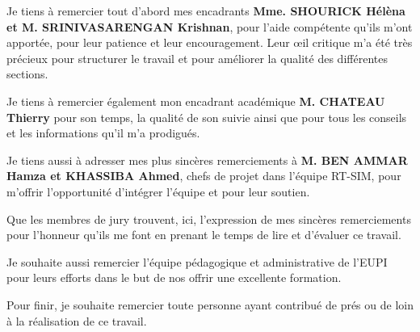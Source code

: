 
Je tiens à remercier tout d’abord mes encadrants \textbf{Mme. SHOURICK Hélèna et M. SRINIVASARENGAN Krishnan}, pour l’aide compétente qu’ils m’ont apportée, pour leur patience et leur encouragement. Leur œil critique m’a été très précieux pour structurer le travail et pour améliorer la qualité des différentes sections.

Je tiens à remercier également mon encadrant académique \textbf{M. CHATEAU Thierry} pour son temps, la qualité de son suivie ainsi que pour tous les conseils et les informations qu'il m’a prodigués.

Je tiens aussi à adresser mes plus sincères remerciements à \textbf{M. BEN AMMAR Hamza et KHASSIBA Ahmed}, chefs de projet dans l'équipe RT-SIM, pour m'offrir l'opportunité d'intégrer l'équipe et pour leur soutien.

Que les membres de jury trouvent, ici, l'expression de mes sincères remerciements pour l'honneur qu'ils me font en prenant le temps de lire et d'évaluer ce travail.

Je souhaite aussi remercier l'équipe pédagogique et administrative de l'EUPI pour leurs efforts dans le but de nos offrir une excellente formation.

Pour finir, je souhaite remercier toute personne ayant contribué de prés ou de loin à la réalisation de ce travail.


\clearpage